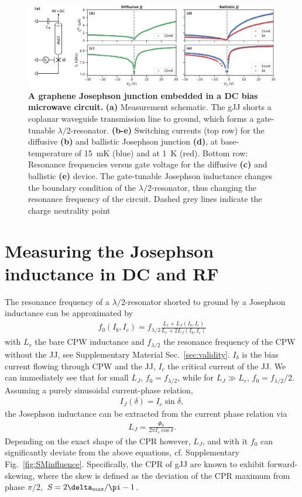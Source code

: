 \begin{figure}
	\centering
	\includegraphics[width=\linewidth]{chapter-gJJ-CPR/figs/Figure1}
	\caption{
		\textbf{A graphene Josephson junction embedded in a DC bias microwave circuit.}
		\textbf{(a)} Measurement schematic.
		The gJJ shorts a coplanar waveguide transmission line to ground, which forms a gate-tunable $\lambda/2$-resonator.
		\textbf{(b-e)} Switching currents (top row) for the diffusive \textbf{(b)} and ballistic Josephson junction \textbf{(d)}, at base-temperature of \SI{15}{\milli\kelvin} (blue) and at \SI{1}{\kelvin} (red).
		Bottom row: Resonance frequencies versus gate voltage for the diffusive \textbf{(c)} and ballistic \textbf{(e)} device.
		The gate-tunable Josephson inductance changes the boundary condition of the $\lambda/2$-resonator, thus changing the resonance frequency of the circuit.
		Dashed grey lines indicate the charge neutrality point
	}
	\label{fig:figure1}
\end{figure}

\section{Measuring the Josephson inductance in DC and RF}

The resonance frequency of a $\lambda/2$-resonator shorted to ground by a Josephson inductance can be approximated by
\begin{align}
f_0\left(I_b,I_c\right) = f_{\lambda/2} \frac{L_r+L_J\left(I_b, I_c\right)}{L_r +  2L_J\left(I_b, I_c\right)}
\label{eq:Pogorzalek}
\end{align}
%
with $L_r$ the bare CPW inductance and $f_{\lambda/2}$ the resonance frequency of the CPW without the JJ, see Supplementary Material Sec.~\ref{sec:validity}.
%
$I_b$ is the bias current flowing through CPW and the JJ, $I_c$ the critical current of the JJ.
%
We can immediately see that for small $L_J$, $f_0=f_{\lambda/2}$, while for $L_J\gg L_r$, $f_0=f_{\lambda/2}/2$.
%
Assuming a purely sinusoidal current-phase relation,
%
\begin{align}
I_J(\delta) = I_c\sin\delta,
\label{eq:CPR-sin}
\end{align}
%
the Josephson inductance can be extracted from the current phase relation via
%
\begin{align}
L_J = \frac{\Phi_0}{2\pi I_c \cos\delta}.
\label{eq:LJsin}
\end{align}
%
Depending on the exact shape of the CPR however, $L_J$, and with it $f_0$ can significantly deviate from the above equations, cf. Supplementary Fig.~\ref{fig:SMinfluence}.
%
Specifically, the CPR of gJJ are known to exhibit forward-skewing, where the skew is defined as the deviation of the CPR maximum from phase $\pi/2$, $S=2\delta_{\rm max}/\pi -1$.

